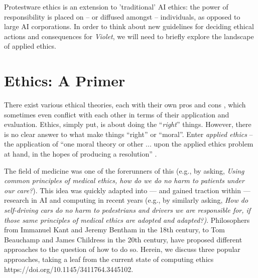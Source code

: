 \documentclass[journal,twocolumn]{IEEEtran}
\begin{document}
Protestware ethics is an extension to 'traditional' AI ethics: the power of responsibility is placed on -- or diffused amongst -- individuals, as opposed to large AI corporations.
In order to think about new guidelines for deciding ethical actions and consequences for \textit{Violet}, we will need to briefly explore the landscape of applied ethics.

\section{Ethics: A Primer}

\label{sec:ethics}
There exist various ethical theories, each with their own pros and cons \cite{Rachels2015}, which sometimes even conflict with each other in terms of their application and evaluation. 
Ethics, simply put, is about doing the ``\textit{right}'' things. However, there is no clear answer to what make things ``right'' or ``moral''. Enter \textit{applied ethics} -- the application of ``one moral theory or other ... upon the applied ethics problem at hand, in the hopes of producing a resolution'' \cite{sep-theory-bioethics}. 

The field of medicine was one of the forerunners of this (e.g., by asking, \textit{Using common principles of medical ethics, how do we do no harm to patients under our care?}). This idea was quickly adapted into --- and gained traction within --- research in AI and computing in recent years (e.g., by similarly asking, \textit{How do self-driving cars do no harm to pedestrians and drivers we are responsible for, if those same principles of medical ethics are adopted and adapted?)}. 
Philosophers from Immanuel Kant and Jeremy Bentham in the 18th century, to Tom Beauchamp and James Childress in the 20th century, have proposed different approaches to the question of how to do so. Herein, we discuss three popular approaches, taking a leaf from the current state of computing ethics https://doi.org/10.1145/3411764.3445102.



\end{document}

